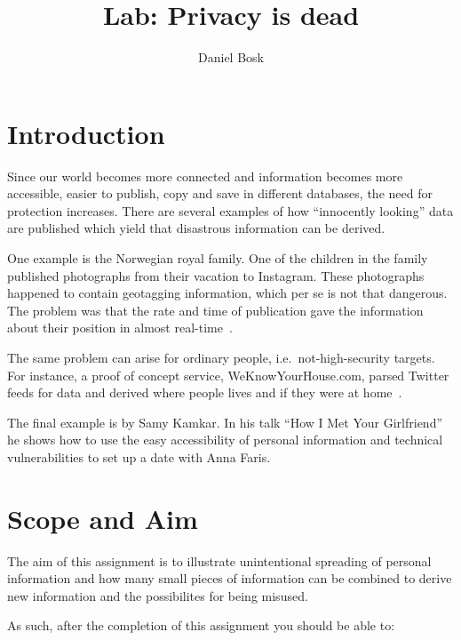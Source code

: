 \title{Lab: Privacy is dead}
\author{Daniel Bosk}

\maketitle
\tableofcontents


\section{Introduction}%
\label{sec:introduction}
Since our world becomes more connected and information becomes more accessible, 
easier to publish, copy and save in different databases, the need for 
protection increases.
There are several examples of how ``innocently looking'' data are published 
which yield that disastrous information can be derived.

One example is the Norwegian royal family.
One of the children in the family published photographs from their vacation to 
Instagram.
These photographs happened to contain geotagging information, which per se is 
not that dangerous.
The problem was that the rate and time of publication gave the information 
about their position in almost real-time~\cite{Roberts2012wia}.

The same problem can arise for ordinary people, i.e.\ not-high-security 
targets.
For instance, a proof of concept service, WeKnowYourHouse.com, parsed Twitter 
feeds for data and derived where people lives and if they were at 
home~\cite{Brading2012tpl}.

The final example is by Samy Kamkar.
In his talk ``How I Met Your Girlfriend''~\cite{Kamkar2010him} he shows how to 
use the easy accessibility of personal information and technical 
vulnerabilities to set up a date with Anna Faris.


\section{Scope and Aim}%
\label{sec:aim}
The aim of this assignment is to illustrate unintentional spreading of personal 
information and how many small pieces of information can be combined to derive 
new information and the possibilites for being misused.

As such, after the completion of this assignment you should be able to:
\begin{itemize}
	
\end{itemize}


